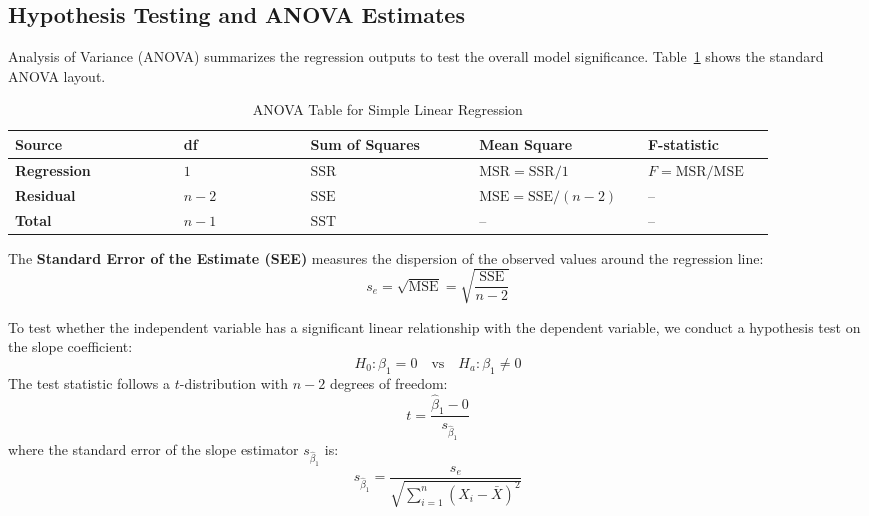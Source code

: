 \subsection{Hypothesis Testing and ANOVA Estimates}
Analysis of Variance (ANOVA) summarizes the regression outputs to test the overall model significance. Table~\ref{tab:mod10_anova_template} shows the standard ANOVA layout.

\begin{table}[!htbp]
\centering
\caption{ANOVA Table for Simple Linear Regression}
\label{tab:mod10_anova_template}
\begin{tabular}{p{0.20\linewidth} p{0.15\linewidth} p{0.20\linewidth} p{0.20\linewidth} p{0.15\linewidth}}
	\toprule
	\textbf{Source} & \textbf{df} & \textbf{Sum of Squares} & \textbf{Mean Square} & \textbf{F-statistic} \\
	\midrule
	\textbf{Regression} & $1$ & $\text{SSR}$ & $\text{MSR} = \text{SSR} / 1$ & $F = \text{MSR} / \text{MSE}$ \\
	\midrule
	\textbf{Residual} & $n - 2$ & $\text{SSE}$ & $\text{MSE} = \text{SSE} / (n - 2)$ & -- \\
	\midrule
	\textbf{Total} & $n - 1$ & $\text{SST}$ & -- & -- \\
	\bottomrule
\end{tabular}
\end{table}

The \textbf{Standard Error of the Estimate (SEE)} measures the dispersion of the observed values around the regression line:
\begin{equation}
	s_e = \sqrt{\text{MSE}} = \sqrt{\frac{\text{SSE}}{n - 2}}
	\label{eq:see_definition_m10}
\end{equation}

To test whether the independent variable has a significant linear relationship with the dependent variable, we conduct a hypothesis test on the slope coefficient:
\[ H_0: \beta_1 = 0 \quad \text{vs} \quad H_a: \beta_1 \neq 0 \]
The test statistic follows a $t$-distribution with $n-2$ degrees of freedom:
\begin{equation}
	t = \frac{\hat{\beta}_1 - 0}{s_{\hat{\beta}_1}}
	\label{eq:t_stat_slope_m10}
\end{equation}
where the standard error of the slope estimator $s_{\hat{\beta}_1}$ is:
\begin{equation}
	s_{\hat{\beta}_1} = \frac{s_e}{\sqrt{\sum_{i=1}^n (X_i - \bar{X})^2}}
	\label{eq:se_slope_m10}
\end{equation}

